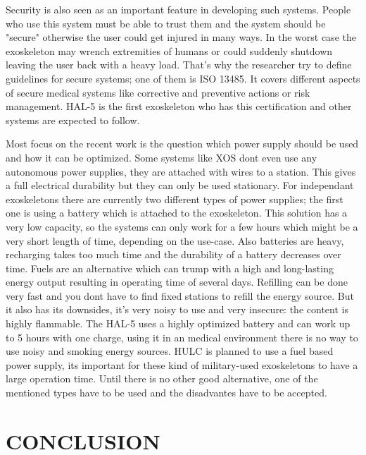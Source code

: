 \documentclass[letterpaper, 10 pt, conference]{ieeeconf}  %
\begin{document}

Security is also seen as an important feature in developing such systems. People who use this system must be able to trust them and the system should be "secure" otherwise the user could get injured in many ways. In the worst case the exoskeleton may wrench extremities of humans or could suddenly shutdown leaving the user back with a heavy load. That's why the researcher try to define guidelines for secure systems; one of them is ISO 13485. It covers different aspects of secure medical systems like corrective and preventive actions or risk management. HAL-5 is the first exoskeleton who has this certification and other systems are expected to follow.


Most focus on the recent work is the question which power supply should be used and how it can be optimized. Some systems like XOS dont even use any autonomous power supplies, they are attached with wires to a station. This gives a full electrical durability but they can only be used stationary. For independant exoskeletons there are currently two different types of power supplies; the first one is using a battery which is attached to the exoskeleton. This solution has a very low capacity, so the systems can only work for a few hours which might be a very short length of time, depending on the use-case. Also batteries are heavy, recharging takes too much time and the durability of a battery decreases over time. Fuels are an alternative which can trump with a high and long-lasting energy output resulting in operating time of several days. Refilling can be done very fast and you dont have to find fixed stations to refill the energy source. But it also has its downsides, it's very noisy to use and very insecure: the content is highly flammable. The HAL-5 uses a highly optimized battery and can work up to 5 hours with one charge, using it in an medical environment there is no way to use noisy and smoking energy sources. HULC is planned to use a fuel based power supply, its important for these kind of military-used exoskeletons to have a large operation time. Until there is no other good alternative, one of the mentioned types have to be used and the disadvantes have to be accepted.
 

\section{CONCLUSION}
\end{document}

